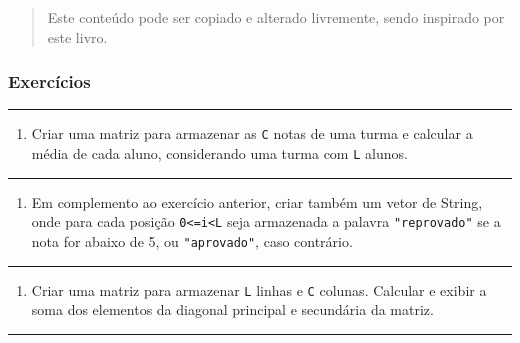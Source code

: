 \documentclass[12pt,a4paper]{article}
\renewcommand{\linethickness}{0.05em}
\providecommand{\tightlist}{%
      \setlength{\itemsep}{0pt}\setlength{\parskip}{0pt}}
\begin{document}
\begin{quote}
Este conteúdo pode ser copiado e alterado livremente, sendo inspirado
por este livro.
\end{quote}

    \hypertarget{exercuxedcios}{%
\subsubsection{Exercícios}\label{exercuxedcios}}

    \begin{center}\rule{0.5\linewidth}{\linethickness}\end{center}

\begin{enumerate}
\def\labelenumi{\arabic{enumi}.}
\tightlist
\item
  Criar uma matriz para armazenar as \texttt{C} notas de uma turma e
  calcular a média de cada aluno, considerando uma turma com \texttt{L}
  alunos.
\end{enumerate}

    \begin{center}\rule{0.5\linewidth}{\linethickness}\end{center}

\begin{enumerate}
\def\labelenumi{\arabic{enumi}.}
\setcounter{enumi}{1}
\tightlist
\item
  Em complemento ao exercício anterior, criar também um vetor de String,
  onde para cada posição \texttt{0\textless{}=i\textless{}L} seja
  armazenada a palavra \texttt{"reprovado"} se a nota for abaixo de 5,
  ou \texttt{"aprovado"}, caso contrário.
\end{enumerate}

    \begin{center}\rule{0.5\linewidth}{\linethickness}\end{center}

\begin{enumerate}
\def\labelenumi{\arabic{enumi}.}
\setcounter{enumi}{2}
\tightlist
\item
  Criar uma matriz para armazenar \texttt{L} linhas e \texttt{C}
  colunas. Calcular e exibir a soma dos elementos da diagonal principal
  e secundária da matriz.
\end{enumerate}

    \begin{center}\rule{0.5\linewidth}{\linethickness}\end{center}
\end{document}
